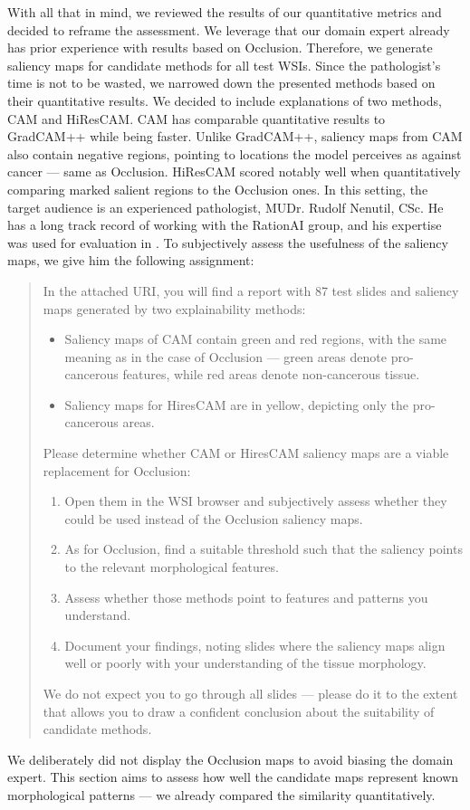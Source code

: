 With all that in mind, we reviewed the results of our quantitative metrics and decided to reframe the assessment.
We leverage that our domain expert already has prior experience with results based on Occlusion.
Therefore, we generate saliency maps for candidate methods for all test WSIs.
Since the pathologist's time is not to be wasted, we narrowed down the presented methods based on their quantitative results.
We decided to include explanations of two methods, CAM and HiResCAM.
CAM has comparable quantitative results to GradCAM++ while being faster.
Unlike GradCAM++, saliency maps from CAM also contain negative regions, pointing to locations the model perceives as against cancer --- same as Occlusion.
HiResCAM scored notably well when quantitatively comparing marked salient regions to the Occlusion ones.
In this setting, the target audience is an experienced pathologist, MUDr. Rudolf Nenutil, CSc.
He has a long track record of working with the RationAI group, and his expertise was used for evaluation in \cite{gallo}.
To subjectively assess the usefulness of the saliency maps, we give him the following assignment:

\begin{doublebar}
\begin{quote}
In the attached URI, you will find a report with 87 test slides and saliency maps generated by two explainability methods:
\begin{itemize}
    \item Saliency maps of CAM contain green and red regions, with the same meaning as in the case of Occlusion --- green areas denote pro-cancerous features, while red areas denote non-cancerous tissue.
    \item Saliency maps for HiresCAM are in yellow, depicting only the pro-cancerous areas.
\end{itemize}
Please determine whether CAM or HiresCAM saliency maps are a viable replacement for Occlusion:
\begin{enumerate}
    \item Open them in the WSI browser and subjectively assess whether they could be used instead of the Occlusion saliency maps.
    \item As for Occlusion, find a suitable threshold such that the saliency points to the relevant morphological features.
    \item Assess whether those methods point to features and patterns you understand.
    \item Document your findings, noting slides where the saliency maps align well or poorly with your understanding of the tissue morphology.
\end{enumerate}
We do not expect you to go through all slides --- please do it to the extent that allows you to draw a confident conclusion about the suitability of candidate methods.
\end{quote}
\end{doublebar}
We deliberately did not display the Occlusion maps to avoid biasing the domain expert.
This section aims to assess how well the candidate maps represent known morphological patterns --- we already compared the similarity quantitatively.

